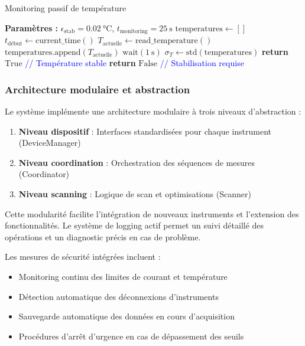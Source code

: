 \begin{algorithm}[ht]
\caption{Monitoring passif de température}
\begin{algorithmic}[1]
\State \textbf{Paramètres :} $\epsilon_{\text{stab}} = \SI{0,02}{\celsius}$, $t_{\text{monitoring}} = \SI{25}{\second}$
\State $\text{temperatures} \leftarrow []$
\State $t_{\text{début}} \leftarrow \text{current\_time}()$
    \State $T_{\text{actuelle}} \leftarrow \text{read\_temperature}()$
    \State $\text{temperatures.append}(T_{\text{actuelle}})$
    \State $\text{wait}(\SI{1}{\second})$
\EndWhile
\State $\sigma_T \leftarrow \text{std}(\text{temperatures})$
    \State \textbf{return} $\text{True}$ \textcolor{blue}{// Température stable}
\Else
    \State \textbf{return} $\text{False}$ \textcolor{blue}{// Stabilisation requise}
\EndIf
\end{algorithmic}
\end{algorithm}

\subsubsection{Architecture modulaire et abstraction}

Le système implémente une architecture modulaire à trois niveaux d'abstraction :

\begin{enumerate}
\item \textbf{Niveau dispositif} : Interfaces standardisées pour chaque instrument (DeviceManager)
\item \textbf{Niveau coordination} : Orchestration des séquences de mesures (Coordinator)
\item \textbf{Niveau scanning} : Logique de scan et optimisations (Scanner)
\end{enumerate}

Cette modularité facilite l'intégration de nouveaux instruments et l'extension des fonctionnalités. Le système de logging actif permet un suivi détaillé des opérations et un diagnostic précis en cas de problème.

Les mesures de sécurité intégrées incluent :
\begin{itemize}
\item Monitoring continu des limites de courant et température
\item Détection automatique des déconnexions d'instruments
\item Sauvegarde automatique des données en cours d'acquisition
\item Procédures d'arrêt d'urgence en cas de dépassement des seuils
\end{itemize}

